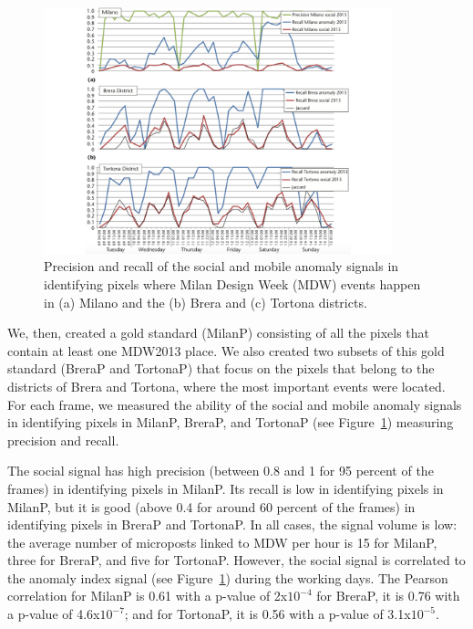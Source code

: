 \begin{figure}[t]
\begin{center}
\includegraphics[width=0.90\textwidth]{img/mdw-prec-rec} 
\caption{Precision and recall of the social and mobile anomaly signals in identifying pixels where Milan Design Week (MDW) events happen in (a) Milano and the (b) Brera and (c) Tortona districts.}
\label{fig:mdw-prec-rec}
\end{center}
\end{figure}

We, then, created a gold standard (MilanP) consisting of all the pixels that contain at least one MDW2013 place. We also created two subsets of this gold standard (BreraP and TortonaP) that focus on the pixels that belong to the districts of Brera and Tortona, where the most important events were located. 
For each frame, we measured the ability of the social and mobile anomaly signals in identifying pixels in MilanP, BreraP, and TortonaP (see Figure~\ref{fig:mdw-prec-rec}) measuring precision and recall.

The social signal has high precision (between 0.8 and 1 for 95 percent of the frames) in identifying pixels in MilanP. Its recall is low in identifying pixels in MilanP, but it is good (above 0.4 for around 60 percent of the frames) in identifying pixels in BreraP and TortonaP. In all cases, the signal volume is low: the average number of microposts linked to MDW per hour is 15 for MilanP, three for BreraP, and five for TortonaP.
However, the social signal is correlated to the anomaly index signal (see Figure~\ref{fig:mdw-prec-rec}) during the working days. The Pearson correlation for MilanP is 0.61 with a p-value of 2x$10^{-4}$ for BreraP, it is 0.76 with a p-value of 4.6x$10^{-7}$; and for TortonaP, it is 0.56 with a p-value of 3.1x$10^{-5}$. 

